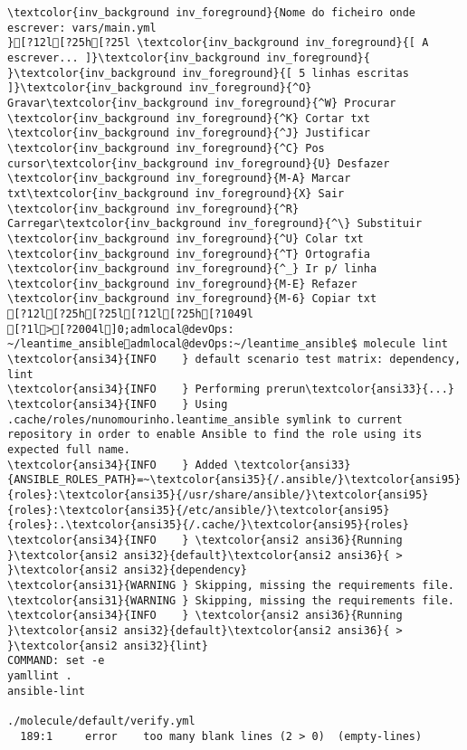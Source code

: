 \documentclass{scrartcl}
\begin{document}
\begin{Verbatim}
\textcolor{inv_background inv_foreground}{Nome do ficheiro onde escrever: vars/main.yml                                                                                             }[?12l[?25h[?25l \textcolor{inv_background inv_foreground}{[ A escrever... ]}\textcolor{inv_background inv_foreground}{          }\textcolor{inv_background inv_foreground}{[ 5 linhas escritas ]}\textcolor{inv_background inv_foreground}{^O} Gravar\textcolor{inv_background inv_foreground}{^W} Procurar      \textcolor{inv_background inv_foreground}{^K} Cortar txt    \textcolor{inv_background inv_foreground}{^J} Justificar    \textcolor{inv_background inv_foreground}{^C} Pos cursor\textcolor{inv_background inv_foreground}{U} Desfazer     \textcolor{inv_background inv_foreground}{M-A} Marcar txt\textcolor{inv_background inv_foreground}{X} Sair    \textcolor{inv_background inv_foreground}{^R} Carregar\textcolor{inv_background inv_foreground}{^\} Substituir    \textcolor{inv_background inv_foreground}{^U} Colar txt     \textcolor{inv_background inv_foreground}{^T} Ortografia    \textcolor{inv_background inv_foreground}{^_} Ir p/ linha   \textcolor{inv_background inv_foreground}{M-E} Refazer      \textcolor{inv_background inv_foreground}{M-6} Copiar txt
[?12l[?25h[?25l[?12l[?25h[?1049l
[?1l>[?2004l]0;admlocal@devOps: ~/leantime_ansibleadmlocal@devOps:~/leantime_ansible$ molecule lint
\textcolor{ansi34}{INFO    } default scenario test matrix: dependency, lint
\textcolor{ansi34}{INFO    } Performing prerun\textcolor{ansi33}{...}
\textcolor{ansi34}{INFO    } Using .cache/roles/nunomourinho.leantime_ansible symlink to current repository in order to enable Ansible to find the role using its expected full name.
\textcolor{ansi34}{INFO    } Added \textcolor{ansi33}{ANSIBLE_ROLES_PATH}=~\textcolor{ansi35}{/.ansible/}\textcolor{ansi95}{roles}:\textcolor{ansi35}{/usr/share/ansible/}\textcolor{ansi95}{roles}:\textcolor{ansi35}{/etc/ansible/}\textcolor{ansi95}{roles}:.\textcolor{ansi35}{/.cache/}\textcolor{ansi95}{roles}
\textcolor{ansi34}{INFO    } \textcolor{ansi2 ansi36}{Running }\textcolor{ansi2 ansi32}{default}\textcolor{ansi2 ansi36}{ > }\textcolor{ansi2 ansi32}{dependency}
\textcolor{ansi31}{WARNING } Skipping, missing the requirements file.
\textcolor{ansi31}{WARNING } Skipping, missing the requirements file.
\textcolor{ansi34}{INFO    } \textcolor{ansi2 ansi36}{Running }\textcolor{ansi2 ansi32}{default}\textcolor{ansi2 ansi36}{ > }\textcolor{ansi2 ansi32}{lint}
COMMAND: set -e
yamllint .
ansible-lint

./molecule/default/verify.yml
  189:1     error    too many blank lines (2 > 0)  (empty-lines)


\end{Verbatim}
\end{document}
